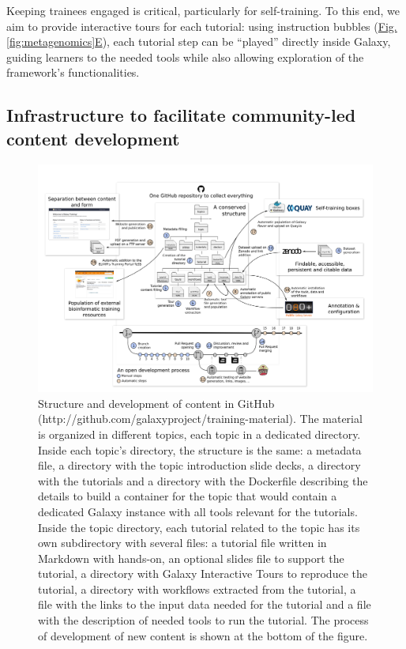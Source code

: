 Keeping trainees engaged is critical, particularly for self-training. To this end, we aim to provide interactive tours for each tutorial: using instruction bubbles (\hyperref[fig:metagenomics]{Fig. \ref{fig:metagenomics}E}), each tutorial step can be “played” directly inside Galaxy, guiding learners to the needed tools while also allowing exploration of the framework’s functionalities.


\subsection*{Infrastructure to facilitate community-led content development}

\begin{figure}[t!]
    \centering
    \includegraphics[width=\textwidth]{chapters/images/training/training-figure-development.png}
    \caption{Structure and development of content in GitHub (http://github.com/galaxyproject/training-material). The material is organized in different topics, each topic in a dedicated directory. Inside each topic’s directory, the structure is the same: a metadata file, a directory with the topic introduction slide decks, a directory with the tutorials and a directory with the Dockerfile describing the details to build a container for the topic that would contain a dedicated Galaxy instance with all tools relevant for the tutorials. Inside the topic directory, each tutorial related to the topic has its own subdirectory with several files: a tutorial file written in Markdown with hands-on, an optional slides file to support the tutorial, a directory with Galaxy Interactive Tours to reproduce the tutorial, a directory with workflows extracted from the tutorial, a file with the links to the input data needed for the tutorial and a file with the description of needed tools to run the tutorial. The process of development of new content is shown at the bottom of the figure.}
    \label{fig:development}
\end{figure}

